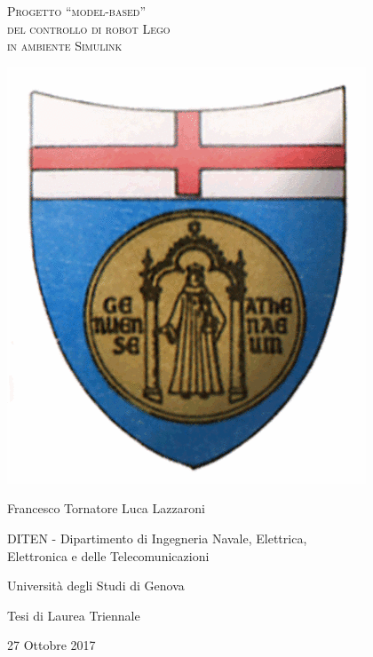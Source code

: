 \documentclass[a4paper,11pt,twoside]{book}
\begin{document}
\thispagestyle{empty}
\begin{center}
	\begin{Huge}
		\textsc{Progetto ``model-based''\\
				del controllo di robot Lego\\
				in ambiente Simulink\\}
	\end{Huge}
\end{center}
\vfill
\begin{center}
	\includegraphics[scale=0.35]{logo_unige.png}
\end{center}
\vfill
\begin{center}
	{\LARGE Francesco Tornatore Luca Lazzaroni}
\end{center}

\begin{center}
	{\Large DITEN - Dipartimento di Ingegneria Navale, Elettrica,\\
	Elettronica e delle Telecomunicazioni}
\end{center}
\begin{center}
	{\Large Università degli Studi di Genova}	
\end{center}
\vfill
\begin{center}
	{\large Tesi di Laurea Triennale}
\end{center}
\begin{center}
	{\large 27 Ottobre 2017}
\end{center}
\end{document}
